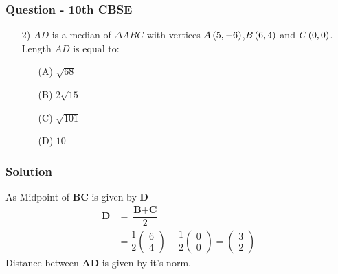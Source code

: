 \documentclass{beamer}
\begin{document}
\begin{frame}
\frametitle{Question - 10th CBSE}
\begin{enumerate}
\item [2)]
$AD$ is a median of $\Delta ABC$ with vertices $A\left(5,-6\right)$,$B\left(6,4\right)$ and $C\left(0,0\right)$. Length $AD$ is equal to:
\begin{enumerate}
\item [(A)] $\sqrt{68}$
\item [(B)] $2\sqrt{15}$
\item [(C)] $\sqrt{101}$
\item [(D)] $10$
\end{enumerate}
\end{enumerate}
\end{frame}



\begin{frame}
\frametitle{Solution}
As Midpoint of $\textbf{BC}$ is given by $\textbf{D}$
\begin{align}
    \textbf{D} &= \dfrac{\textbf{B} + \textbf{C}}{2}\\
    &=\dfrac{1}{2}\begin{pmatrix}
        6\\
        4
    \end{pmatrix}
    +
   \dfrac{1}{2} \begin{pmatrix}
        0\\
        0
    \end{pmatrix} = \begin{pmatrix}
        3\\
        2
    \end{pmatrix}
\end{align}
Distance between $\textbf{AD}$ is given by it's norm.
\end{frame}
\end{document}
